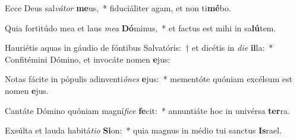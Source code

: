 \item Ecce Deus sal\textit{vá}\textit{tor} \textbf{me}us,~* fiduciáliter agam, et non ti\textbf{mé}bo.
\item Quia fortitúdo mea et laus \textit{me}\textit{a} \textbf{Dó}minus,~* et factus est mihi in sa\textbf{lú}tem.
\item Hauriétis aquas in gáudio de fóntibus Salvatóris:~† et dicétis in \textit{di}\textit{e} \textbf{il}la:~* Confitémini Dómino, et invocáte nomen \textbf{e}jus:
\item Notas fácite in pópulis adinventi\textit{ó}\textit{nes} \textbf{e}jus:~* mementóte quóniam excélsum est nomen \textbf{e}jus.
\item Cantáte Dómino quóniam magní\textit{fi}\textit{ce} \textbf{fe}cit:~* annuntiáte hoc in univérsa \textbf{ter}ra.
\item Exsúlta et lauda habitá\textit{ti}\textit{o} \textbf{Si}on:~* quia magnus in médio tui sanctus \textbf{Is}rael.
